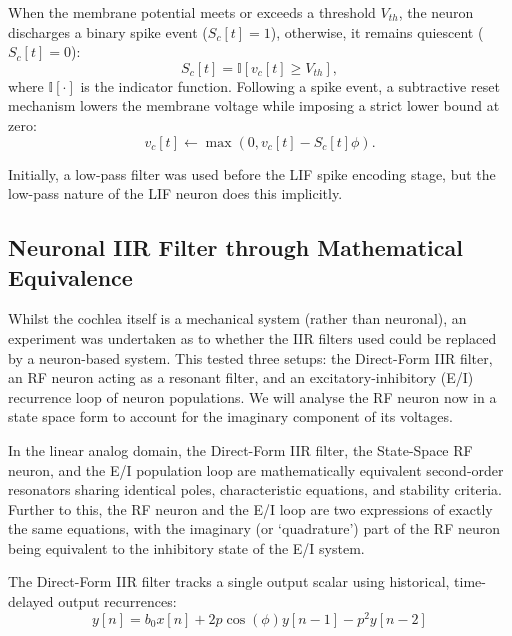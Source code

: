When the membrane potential meets or exceeds a threshold $V_{th}$, the neuron discharges a binary spike event ($S_c[t] = 1$), otherwise, it remains quiescent ($S_c[t] = 0$):
\begin{equation}
    S_c[t] = \mathbb{I}\left[v_c[t] \geq V_{th}\right],
\end{equation}
where $\mathbb{I}[\cdot]$ is the indicator function. Following a spike event, a subtractive reset mechanism lowers the membrane voltage while imposing a strict lower bound at zero:
\begin{equation}
    v_c[t] \leftarrow \max\left(0, v_c[t] - S_c[t]\phi\right).
\end{equation}

Initially, a low-pass filter was used before the LIF spike encoding stage, but the low-pass nature of the LIF neuron does this implicitly.

\subsection{Neuronal IIR Filter through Mathematical Equivalence}

Whilst the cochlea itself is a mechanical system (rather than neuronal), an experiment was undertaken as to whether the IIR filters used could be replaced by a neuron-based system. This tested three setups: the Direct-Form IIR filter, an RF neuron acting as a resonant filter, and an excitatory-inhibitory (E/I) recurrence loop of neuron populations. We will analyse the RF neuron now in a state space form to account for the imaginary component of its voltages.

In the linear analog domain, the Direct-Form IIR filter, the State-Space RF neuron, and the E/I population loop are mathematically equivalent second-order resonators sharing identical poles, characteristic equations, and stability criteria. Further to this, the RF neuron and the E/I loop are two expressions of exactly the same equations, with the imaginary (or `quadrature') part of the RF neuron being equivalent to the inhibitory state of the E/I system.

The Direct-Form IIR filter tracks a single output scalar using historical, time-delayed output recurrences:
\begin{equation}
    y[n] = b_0 x[n] + 2p\cos(\phi)y[n-1] - p^2y[n-2]
\end{equation}


